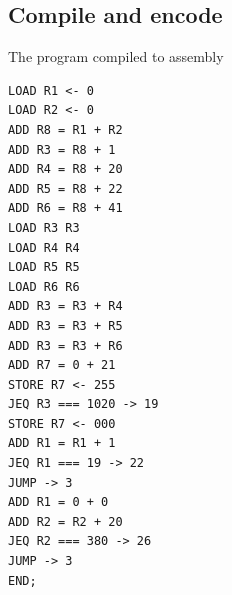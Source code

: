 \documentclass[a4paper, english]{article}
\numberwithin{equation}{section}
\begin{document}
\subsection{Compile and encode}
\begin{listing}[H]
    \centering
    \caption[short]{The program compiled to assembly}\label{lst:ass}
    \begin{verbatim}
LOAD R1 <- 0
LOAD R2 <- 0
ADD R8 = R1 + R2
ADD R3 = R8 + 1
ADD R4 = R8 + 20
ADD R5 = R8 + 22
ADD R6 = R8 + 41
LOAD R3 R3
LOAD R4 R4
LOAD R5 R5
LOAD R6 R6
ADD R3 = R3 + R4
ADD R3 = R3 + R5
ADD R3 = R3 + R6
ADD R7 = 0 + 21
STORE R7 <- 255
JEQ R3 === 1020 -> 19
STORE R7 <- 000
ADD R1 = R1 + 1
JEQ R1 === 19 -> 22
JUMP -> 3
ADD R1 = 0 + 0
ADD R2 = R2 + 20
JEQ R2 === 380 -> 26
JUMP -> 3
END;
    \end{verbatim}
\end{listing}
\end{document}
